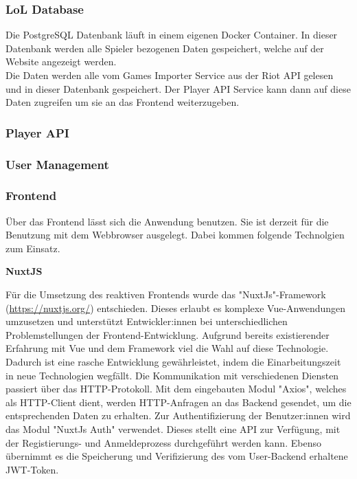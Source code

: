 \subsubsection{LoL Database}
Die PostgreSQL Datenbank läuft in einem eigenen Docker Container. In dieser Datenbank werden alle Spieler bezogenen Daten gespeichert, welche auf der Website angezeigt werden.\\
Die Daten werden alle vom Games Importer Service aus der Riot API gelesen und in dieser Datenbank gespeichert. Der Player API Service kann dann auf diese Daten zugreifen um sie an das Frontend weiterzugeben.

\subsubsection{Player API}

\subsubsection{User Management}

\subsubsection{Frontend}

Über das Frontend lässt sich die Anwendung benutzen. Sie ist derzeit für die Benutzung mit dem Webbrowser ausgelegt. Dabei kommen folgende Technolgien zum Einsatz.

\textbf{NuxtJS}

Für die Umsetzung des reaktiven Frontends wurde das "NuxtJs"-Framework (\href{https://nuxtjs.org/}{https://nuxtjs.org/}) entschieden. Dieses erlaubt es komplexe Vue-Anwendungen umzusetzen und unterstützt Entwickler:innen
bei unterschiedlichen Problemstellungen der Frontend-Entwicklung. Aufgrund bereits existierender Erfahrung mit Vue und dem Framework viel die Wahl auf diese Technologie.
Dadurch ist eine rasche Entwicklung gewährleistet, indem die Einarbeitungszeit in neue Technologien wegfällt. Die Kommunikation mit verschiedenen Diensten passiert
über das HTTP-Protokoll. Mit dem eingebauten Modul "Axios", welches als HTTP-Client dient, werden HTTP-Anfragen an das Backend gesendet, um die entsprechenden Daten 
zu erhalten. Zur Authentifizierung der Benutzer:innen wird das Modul "NuxtJs Auth" verwendet. Dieses stellt eine API zur Verfügung, mit der Registierungs- und Anmeldeprozess durchgeführt werden kann.
Ebenso übernimmt es die Speicherung und Verifizierung des vom User-Backend erhaltene JWT-Token.

